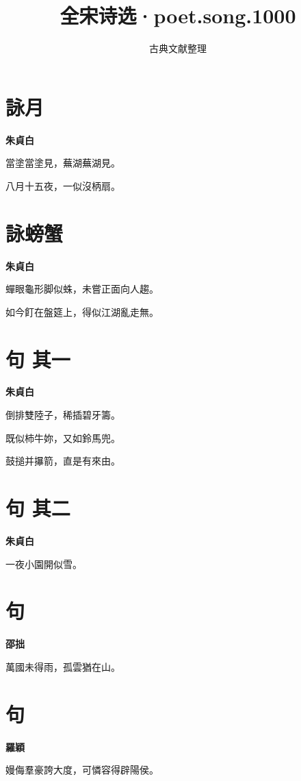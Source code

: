 \documentclass[12pt,a4paper]{ctexbook}
\title{全宋诗选·poet.song.1000}
\author{古典文献整理}
\date{}
\begin{document}
\maketitle
\tableofcontents
\newpage
\section{詠月}
\textbf{朱貞白}\par\vspace{0.5em}
當塗當塗見，蕪湖蕪湖見。\par
八月十五夜，一似沒柄扇。\par

\section{詠螃蟹}
\textbf{朱貞白}\par\vspace{0.5em}
蟬眼龜形脚似蛛，未嘗正面向人趨。\par
如今飣在盤筵上，得似江湖亂走無。\par

\section{句  其一}
\textbf{朱貞白}\par\vspace{0.5em}
倒排雙陸子，稀插碧牙籌。\par
既似柿牛妳，又如鈴馬兜。\par
鼓搥并㩧箭，直是有來由。\par

\section{句  其二}
\textbf{朱貞白}\par\vspace{0.5em}
一夜小園開似雪。\par

\section{句}
\textbf{邵拙}\par\vspace{0.5em}
萬國未得雨，孤雲猶在山。\par

\section{句}
\textbf{羅穎}\par\vspace{0.5em}
嫚侮羣豪誇大度，可憐容得辟陽侯。\par
\end{document}
